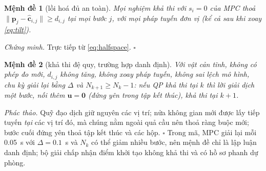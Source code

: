 \documentclass[11pt,a4paper]{article}
\numberwithin{equation}{section}
\newcommand{\vb}[1]{\bm{#1}}
\theoremstyle{definition}
\theoremstyle{plain}
\newtheorem{proposition}{Mệnh đề}
\theoremstyle{remark}
\begin{document}
\begin{proposition}[lồi hoá đủ an toàn]\label{prop:half}
Mọi nghiệm khả thi với $s_i=0$ của MPC thoả $\|\vb p_j-\hat{\vb c}_{i,j}\|\ge d_{i,j}$ tại mọi bước $j$, với mọi pháp tuyến đơn vị (kể cả sau khi xoay \eqref{eq:tilt}).
\end{proposition}
\emph{Chứng minh.} Trực tiếp từ \eqref{eq:halfspace}. $\square$

\begin{proposition}[khả thi đệ quy, trường hợp danh định]\label{prop:rf}
Với vật cản tĩnh, không có phép đo mới, $d_{i,j}$ không tăng, không xoay pháp tuyến, không sai lệch mô hình, chu kỳ giải lại bằng $\Delta$ và $N_{k+1}\ge N_k-1$: nếu QP khả thi tại $k$ thì lời giải dịch một bước, nối thêm $\vb u=\vb 0$ (đứng yên trong tập kết thúc), khả thi tại $k+1$.
\end{proposition}
\emph{Phác thảo.} Quỹ đạo dịch giữ nguyên các vị trí; nửa không gian mới được lấy tiếp tuyến \emph{tại} các vị trí đó, mà chúng nằm ngoài quả cầu nên thoả ràng buộc mới; bước cuối đứng yên thoả tập kết thúc và các hộp. $\square$ Trong mã, MPC giải lại mỗi 0.05~s với $\Delta=0.1$~s và $N_k$ có thể giảm nhiều bước, nên mệnh đề chỉ là lập luận danh định; bộ giải chấp nhận điểm khởi tạo không khả thi và có hồ sơ phanh dự phòng.
\end{document}
